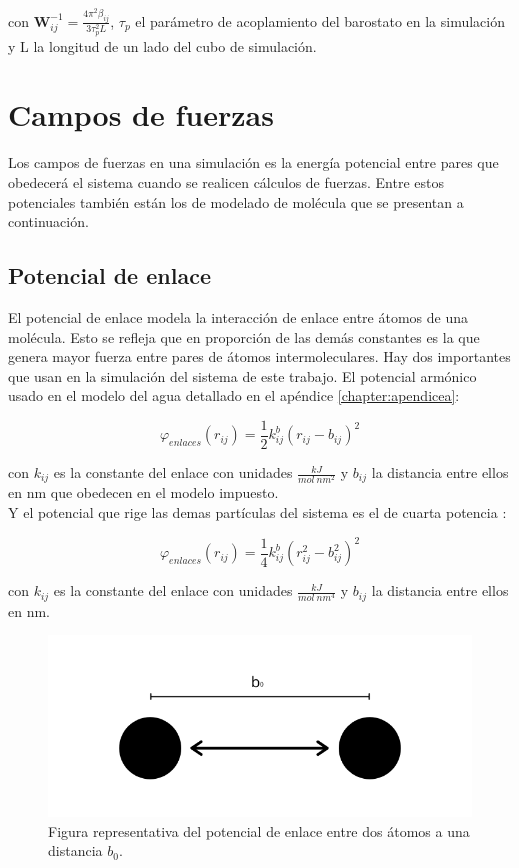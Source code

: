 con $\mathbf{W}^{-1}_{ij}=\frac{4\pi^2 \beta_{ij}}{3\tau_{p}^2 L}$, $\tau_p$ el parámetro de acoplamiento del barostato en la simulación y L la longitud de un lado del cubo de simulación.

\section{Campos de fuerzas}

Los campos de fuerzas en una simulación es la energía potencial entre pares que obedecerá el sistema cuando se realicen cálculos de fuerzas. Entre estos potenciales también están los de modelado de molécula que se presentan a continuación.\\

\subsection{Potencial de enlace}

El potencial de enlace modela la interacción de enlace entre átomos de una molécula. Esto se refleja que en proporción de las demás constantes es la que genera mayor fuerza entre pares de átomos intermoleculares. Hay dos importantes que usan en la simulación del sistema de este trabajo. El potencial armónico usado en el modelo del agua detallado en el apéndice \ref{chapter:apendicea}\cite{gromacsdoc}:

\begin{equation}
    \varphi_{enlaces}(r_{ij}) = \frac{1}{2}k_{ij}^{b}(r_{ij} - b_{ij})^2
\end{equation}

con $k_{ij}$ es la constante del enlace con unidades $\frac{kJ}{mol\ nm^2}$ y $b_{ij}$ la distancia entre ellos en nm que obedecen en el modelo impuesto.\\

Y el potencial que rige las demas partículas del sistema es el de cuarta potencia \cite{gromacsdoc}:

\begin{equation}
    \varphi_{enlaces}(r_{ij}) = \frac{1}{4}k_{ij}^{b}(r_{ij}^2 - b^{2}_{ij})^2
\end{equation}

con $k_{ij}$ es la constante del enlace con unidades $\frac{kJ}{mol\ nm^4}$ y $b_{ij}$ la distancia entre ellos en nm.\\

\begin{figure}[!h]
    \centering
    \includegraphics[width=.4\linewidth]{MD/bondpotential.png}  
    \caption{Figura representativa del potencial de enlace entre dos átomos a una distancia $b_0$.}
    \label{fig:bondpotential}
\end{figure}

